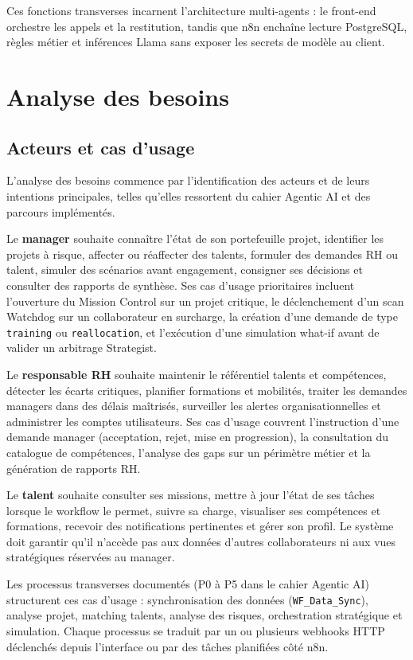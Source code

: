 Ces fonctions transverses incarnent l'architecture multi-agents : le front-end orchestre les appels et la restitution, tandis que n8n enchaîne lecture PostgreSQL, règles métier et inférences Llama sans exposer les secrets de modèle au client.

\section{Analyse des besoins}

\subsection{Acteurs et cas d'usage}

L'analyse des besoins commence par l'identification des acteurs et de leurs intentions principales, telles qu'elles ressortent du cahier Agentic AI et des parcours implémentés.

Le \textbf{manager} souhaite connaître l'état de son portefeuille projet, identifier les projets à risque, affecter ou réaffecter des talents, formuler des demandes RH ou talent, simuler des scénarios avant engagement, consigner ses décisions et consulter des rapports de synthèse. Ses cas d'usage prioritaires incluent l'ouverture du Mission Control sur un projet critique, le déclenchement d'un scan Watchdog sur un collaborateur en surcharge, la création d'une demande de type \texttt{training} ou \texttt{reallocation}, et l'exécution d'une simulation what-if avant de valider un arbitrage Strategist.

Le \textbf{responsable RH} souhaite maintenir le référentiel talents et compétences, détecter les écarts critiques, planifier formations et mobilités, traiter les demandes managers dans des délais maîtrisés, surveiller les alertes organisationnelles et administrer les comptes utilisateurs. Ses cas d'usage couvrent l'instruction d'une demande manager (acceptation, rejet, mise en progression), la consultation du catalogue de compétences, l'analyse des gaps sur un périmètre métier et la génération de rapports RH.

Le \textbf{talent} souhaite consulter ses missions, mettre à jour l'état de ses tâches lorsque le workflow le permet, suivre sa charge, visualiser ses compétences et formations, recevoir des notifications pertinentes et gérer son profil. Le système doit garantir qu'il n'accède pas aux données d'autres collaborateurs ni aux vues stratégiques réservées au manager.

Les processus transverses documentés (P0 à P5 dans le cahier Agentic AI) structurent ces cas d'usage : synchronisation des données (\texttt{WF\_Data\_Sync}), analyse projet, matching talents, analyse des risques, orchestration stratégique et simulation. Chaque processus se traduit par un ou plusieurs webhooks HTTP déclenchés depuis l'interface ou par des tâches planifiées côté n8n.


